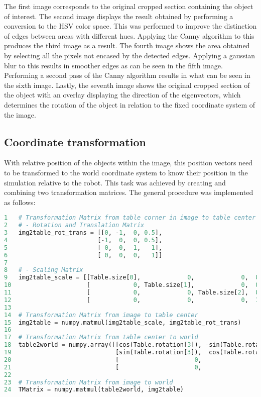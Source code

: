 The first image corresponds to the original cropped section containing the object of interest. The second image displays the result obtained by performing a conversion to the HSV color space. This was performed to improve the distinction of edges between areas with different hues. Applying the Canny algorithm to this produces the third image as a result. The fourth image shows the area obtained by selecting all the pixels not encased by the detected edges. Applying a gaussian blur to this results in smoother edges as can be seen in the fifth image. Performing a second pass of the Canny algorithm results in what can be seen in the sixth image. Lastly, the seventh image shows the original cropped section of the object with an overlay displaying the direction of the eigenvectors, which determines the rotation of the object in relation to the fixed coordinate system of the image.

\subsection{Coordinate transformation}

With relative position of the objects within the image, this position vectors need to be transformed to the world coordinate system to know their position in the simulation relative to the robot. 
This task was achieved by creating and combining two transformation matrices. The general procedure was implemented as follows:


\begin{lstlisting}[language=python]
1   # Transformation Matrix from table corner in image to table center
2   # - Rotation and Translation Matrix
3   img2table_rot_trans = [[0, -1,  0, 0.5],
4                         [-1,  0,  0, 0.5],
5                         [ 0,  0, -1,   1],
6                         [ 0,  0,  0,   1]]
7   
8   # - Scaling Matrix
9   img2table_scale = [[Table.size[0],             0,             0,  0],
10                     [            0, Table.size[1],             0,  0],
11                     [            0,             0, Table.size[2],  0],
12                     [            0,             0,             0,  1]]
13  
14  # Transformation Matrix from image to table center
15  img2table = numpy.matmul(img2table_scale, img2table_rot_trans)
16  
17  # Transformation Matrix from table center to world
18  table2world = numpy.array([[cos(Table.rotation[3]), -sin(Table.rotation[3]),  0,  Table.position[0]],
19                             [sin(Table.rotation[3]),  cos(Table.rotation[3]),  0,  Table.position[1]],
20                             [                     0,                       0,  1,  Table.position[2]],
21                             [                     0,                       0,  0,                 1]])
22  
23  # Transformation Matrix from image to world
24  TMatrix = numpy.matmul(table2world, img2table)
\end{lstlisting}

